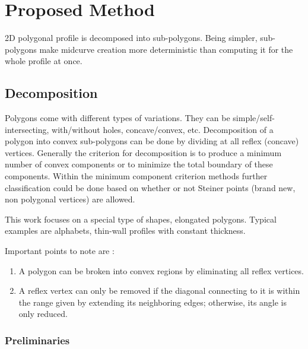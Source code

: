 \section{Proposed Method}	


2D polygonal profile is decomposed  into sub-polygons. Being simpler, sub-polygons make midcurve creation more deterministic than computing it for the whole profile at once.

\subsection{Decomposition}
Polygons come with different types of variations. They can be simple/self-intersecting, with/without holes, concave/convex, etc. Decomposition of a polygon into convex sub-polygons can be done by dividing at all reflex (concave) vertices. Generally the criterion for decomposition is to produce a minimum number of convex components or to minimize the total boundary of these components. Within the minimum component criterion methods further classification could be done based on whether or not Steiner points (brand new, non polygonal vertices) are allowed. 

This work focuses on a special type of shapes, elongated polygons. Typical examples are alphabets, thin-wall profiles with constant thickness. 

Important points to note are \citep{Bayazit}:
\begin{enumerate}
[noitemsep,topsep=2pt]
\item A polygon can be broken into convex regions by eliminating all reflex vertices.
\item A reflex vertex can only be removed if the diagonal connecting to it is within the range given by extending its neighboring edges; otherwise, its angle is only reduced.
\end{enumerate}

\subsubsection{Preliminaries}

